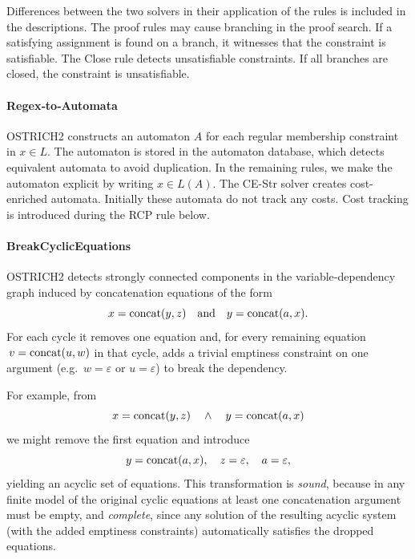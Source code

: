 


Differences between the two solvers in their application of the rules is included in the descriptions.
The proof rules may cause branching in the proof search.
If a satisfying assignment is found on a branch, it witnesses that the constraint is satisfiable.
The Close rule detects unsatisfiable constraints.
If all branches are closed, the constraint is unsatisfiable.

\paragraph{Regex‐to‐Automata}
OSTRICH2 constructs an automaton $A$ for each regular membership constraint in $x \in L$.
The automaton is stored in the automaton database, which detects equivalent automata to avoid duplication.
In the remaining rules, we make the automaton explicit by writing $x \in L(A)$.
The CE-Str solver creates cost-enriched automata.
Initially these automata do not track any costs.
Cost tracking is introduced during the RCP rule below.

\paragraph{BreakCyclicEquations}
OSTRICH2 detects strongly connected components in the variable‐dependency graph induced by concatenation equations of the form
\[
x = \operatorname{concat}(y,z)
\quad\text{and}\quad
y = \operatorname{concat}(a,x).
\]
For each cycle it removes one equation and, for every remaining equation $\,v = \operatorname{concat}(u,w)$ in that cycle, adds a trivial emptiness constraint on one argument (e.g.\ $w = \varepsilon$ or $u = \varepsilon$) to break the dependency.

For example, from
\[
x = \operatorname{concat}(y,z)
\quad\land\quad
y = \operatorname{concat}(a,x)
\]
we might remove the first equation and introduce
\[
y = \operatorname{concat}(a,x),
\quad
z = \varepsilon,
\quad
a = \varepsilon,
\]
yielding an acyclic set of equations.
This transformation is \emph{sound}, because in any finite model of the original cyclic equations at least one concatenation argument must be empty, and \emph{complete}, since any solution of the resulting acyclic system (with the added emptiness constraints) automatically satisfies the dropped equations.

